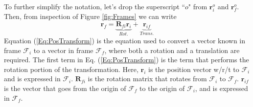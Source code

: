 
To further simplify the notation, let's drop the superscript
``$o$" from $\mathbf{r}_i^o$ and $\mathbf{r}_f^o$.  Then, from
inspection of Figure \ref{fig:Frames} we can write
%
\begin{equation}
      \mathbf{r}_{f} = \underbrace{\mathbf{R}_{fi}\mathbf{r}_{i}}_{Rot.} +
     \underbrace{  \mathbf{r}_{if}}_{Trans.}
     \label{Eq:PosTransform}
\end{equation}
%
Equation (\ref{Eq:PosTransform}) is the equation used to convert a
vector known in frame $\mathcal{F}_i$ to a vector in frame
$\mathcal{F}_f$, where both a rotation and a translation are
required.  The first term in Eq. (\ref{Eq:PosTransform}) is the
term that performs the rotation portion of the transformation.
Here, $\mathbf{r}_{i}$ is the position vector w/r/t to
$\mathcal{F}_i$ and is expressed in $\mathcal{F}_i$.
$\mathbf{R}_{fi}$ is the rotation matrix that rotates from
$\mathcal{F}_i$ to $\mathcal{F}_f$.   $\mathbf{r}_{if}$ is the
vector that goes from the origin of $\mathcal{F}_f$ to the origin
of $\mathcal{F}_i$, and is expressed in $\mathcal{F}_f$.

